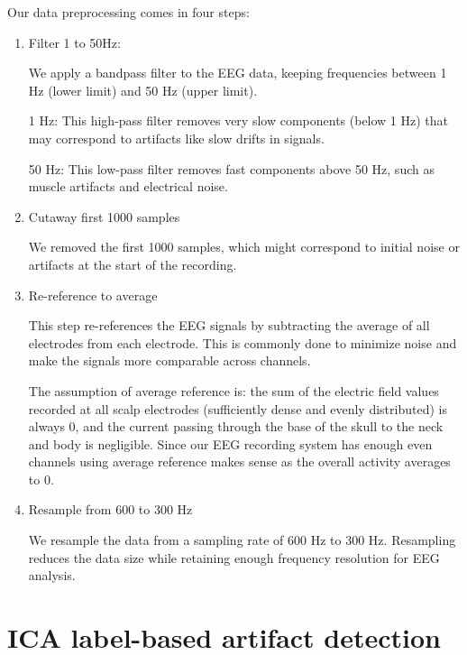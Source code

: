 \documentclass[12pt,a4paper,titlepage,openany]{report}
\begin{document}
Our data preprocessing comes in four steps:
\begin{enumerate}
    \item Filter 1 to 50Hz:
    
    We apply a bandpass filter to the EEG data, keeping frequencies between 1 Hz (lower limit) and 50 Hz (upper limit).

    1 Hz: This high-pass filter removes very slow components (below 1 Hz) that may correspond to artifacts like slow drifts in signals.

    50 Hz: This low-pass filter removes fast components above 50 Hz, such as muscle artifacts and electrical noise.

    \item Cutaway first 1000 samples

    We removed the first 1000 samples, which might correspond to initial noise or artifacts at the start of the recording. 

    \item Re-reference to average

    This step re-references the EEG signals by subtracting the average of all electrodes from each electrode. This is commonly done to minimize noise and make the signals more comparable across channels.

    The assumption of average reference is: the sum of the electric field values recorded at all scalp electrodes (sufficiently dense and evenly distributed) is always 0, and the current passing through the base of the skull to the neck and body is negligible. 
    Since our EEG recording system has enough even channels using average reference makes sense as the overall activity averages to 0.

    \item Resample from 600 to 300 Hz

    We resample the data from a sampling rate of 600 Hz to 300 Hz. Resampling reduces the data size while retaining enough frequency resolution for EEG analysis.

\end{enumerate}

\section{ICA label-based artifact detection}
\end{document}
